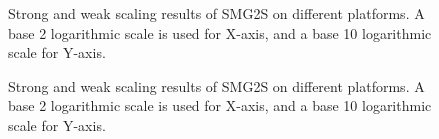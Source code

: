 \begin{figure}[htbp]
	\centering
	\caption{Strong and weak scaling results of SMG2S on different platforms. A base 2 logarithmic scale is used for X-axis, and a base 10 logarithmic scale for Y-axis. }
	\label{fig:scaling-cpu-tianhe-2}
\end{figure}

\begin{figure}[htbp]
	\centering
	\caption{Strong and weak scaling results of SMG2S on different platforms. A base 2 logarithmic scale is used for X-axis, and a base 10 logarithmic scale for Y-axis. }
	\label{fig:scaling-cpu-romeo}
\end{figure}

